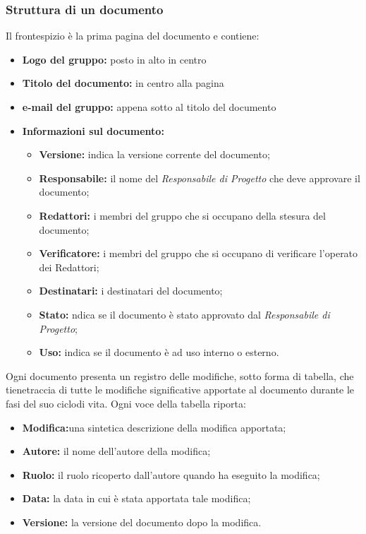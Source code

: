         \subsubsection{Struttura di un documento}
            Il frontespizio è la prima pagina del documento e contiene:
            \begin{itemize}
                \item \textbf{Logo del gruppo:} posto in alto in centro
                \item \textbf{Titolo del documento:} in centro alla pagina
                \item \textbf{e-mail del gruppo:} appena sotto al titolo del documento
                \item \textbf{Informazioni sul documento:}
                    \begin{itemize}
                        \item \textbf{Versione:} indica la versione corrente del documento;
                        \item \textbf{Responsabile:} il nome del \textit{Responsabile di Progetto} che deve approvare il documento;
                        \item \textbf{Redattori:} i membri del gruppo che si occupano della stesura del documento; 
                        \item \textbf{Verificatore:} i membri del gruppo che si occupano di verificare l'operato dei Redattori;
                        \item \textbf{Destinatari:} i destinatari del documento;
                        \item \textbf{Stato:} ndica se il documento è stato approvato dal \textit{Responsabile di Progetto};
                        \item \textbf{Uso:} indica se il documento è ad uso interno o esterno.
                    \end{itemize} 
            \end{itemize}
            Ogni documento presenta un registro delle modifiche, sotto forma di tabella, che tienetraccia di tutte le modifiche significative apportate al documento durante le fasi del suo ciclodi vita. Ogni voce della tabella riporta:
            \begin{itemize}
                \item \textbf{Modifica:}una sintetica descrizione della modifica apportata;
                \item \textbf{Autore:} il nome dell’autore della modifica;
                \item \textbf{Ruolo:} il ruolo ricoperto dall’autore quando ha eseguito la modifica;
                \item \textbf{Data:} la data in cui è stata apportata tale modifica;
                \item \textbf{Versione:} la versione del documento dopo la modifica.
            \end{itemize}
